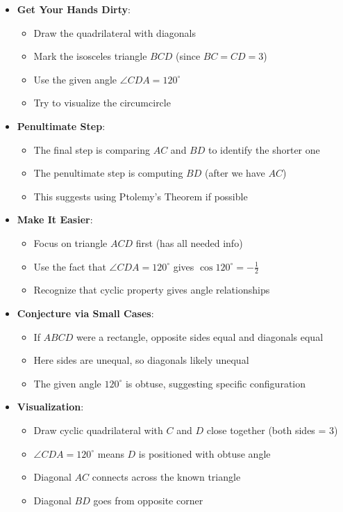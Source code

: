 \documentclass[11pt]{article}
\begin{document}
\begin{strategicbox}
\begin{itemize}[leftmargin=*]
    \item \textbf{Get Your Hands Dirty}: 
    \begin{itemize}
        \item Draw the quadrilateral with diagonals
        \item Mark the isosceles triangle $BCD$ (since $BC = CD = 3$)
        \item Use the given angle $\angle CDA = 120^\circ$
        \item Try to visualize the circumcircle
    \end{itemize}
    
    \item \textbf{Penultimate Step}: 
    \begin{itemize}
        \item The final step is comparing $AC$ and $BD$ to identify the shorter one
        \item The penultimate step is computing $BD$ (after we have $AC$)
        \item This suggests using Ptolemy's Theorem if possible
    \end{itemize}
    
    \item \textbf{Make It Easier}: 
    \begin{itemize}
        \item Focus on triangle $ACD$ first (has all needed info)
        \item Use the fact that $\angle CDA = 120^\circ$ gives $\cos 120^\circ = -\frac{1}{2}$
        \item Recognize that cyclic property gives angle relationships
    \end{itemize}
    
    \item \textbf{Conjecture via Small Cases}: 
    \begin{itemize}
        \item If $ABCD$ were a rectangle, opposite sides equal and diagonals equal
        \item Here sides are unequal, so diagonals likely unequal
        \item The given angle $120^\circ$ is obtuse, suggesting specific configuration
    \end{itemize}
    
    \item \textbf{Visualization}: 
    \begin{itemize}
        \item Draw cyclic quadrilateral with $C$ and $D$ close together (both sides = 3)
        \item $\angle CDA = 120^\circ$ means $D$ is positioned with obtuse angle
        \item Diagonal $AC$ connects across the known triangle
        \item Diagonal $BD$ goes from opposite corner
    \end{itemize}
\end{itemize}


\end{strategicbox}
\end{document}
